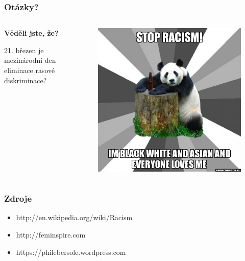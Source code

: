 \documentclass{beamer}
\begin{document}
\begin{frame}
\transwipe
{}
\frametitle{Otázky?}
\begin{columns}
\begin{column}{0.5\textwidth}
\textbf{Věděli jste, že?}

\setlength{\leftskip}{1.3em} 21. březen je mezinárodní den eliminace rasové diskriminace?
\end{column}
\begin{column}{0.5\textwidth}
\begin{figure}[h]
\centering
\includegraphics[scale=0.25]{panda.eps}

\end{figure}
\end{column}
\end{columns}
\end{frame}

\begin{frame}
\transwipe
{}
\frametitle{Zdroje}
\begin{itemize}
\item http://en.wikipedia.org/wiki/Racism
\item http://feminspire.com
\item https://philebersole.wordpress.com
\end{itemize}
\end{frame}
\end{document}

